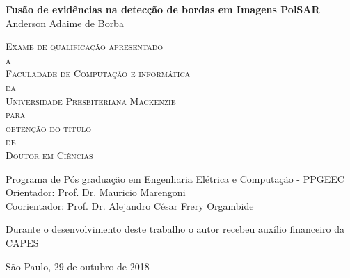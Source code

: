 \documentclass[11pt,twoside,a4paper]{book}
\begin{document}
\frontmatter 
\fancyhead[RO]{{\footnotesize\rightmark}\hspace{2em}\thepage}
\setcounter{tocdepth}{2}
\fancyhead[LE]{\thepage\hspace{2em}\footnotesize{\leftmark}}
\fancyhead[RE,LO]{}
\fancyhead[RO]{{\footnotesize\rightmark}\hspace{2em}\thepage}

\onehalfspacing  %

\thispagestyle{empty}
\begin{center}
    \vspace*{2.3cm}
    \textbf{\Large{Fusão de evidências na detecção de bordas em Imagens PolSAR}}\\
    
    \vspace*{1.2cm}
    \Large{Anderson Adaime de Borba}
    
    \vskip 2cm
    \textsc{
    Exame de qualificação apresentado\\[-0.25cm] 
    a\\[-0.25cm]
    Faculadade de Computação e informática\\[-0.25cm]
    da\\[-0.25cm]
    Universidade Presbiteriana Mackenzie\\[-0.25cm]
    para\\[-0.25cm]
    obtenção do título\\[-0.25cm]
    de\\[-0.25cm]
    Doutor em Ciências}
    
    \vskip 1.5cm
    Programa de Pós graduação em Engenharia Elétrica e Computação - PPGEEC\\
    Orientador: Prof. Dr. Mauricio Marengoni\\
    Coorientador: Prof. Dr. Alejandro César Frery Orgambide

   	\vskip 1cm
    \normalsize{Durante o desenvolvimento deste trabalho o autor recebeu auxílio
    financeiro da CAPES}
    
    \vskip 0.5cm
    \normalsize{São Paulo, 29  de outubro de 2018}
\end{center}
\end{document}
